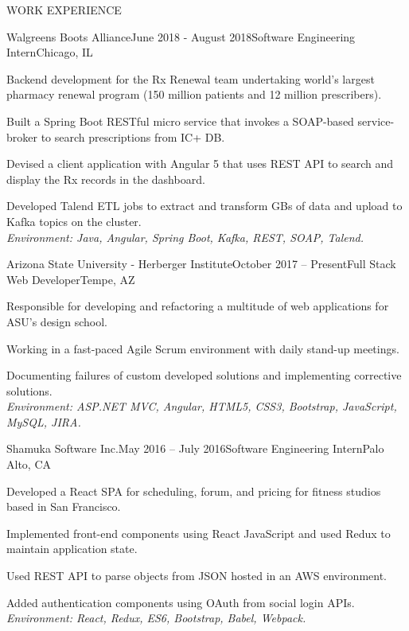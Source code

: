 \documentclass{resume} %
\begin{document}
\begin{rSection}{WORK EXPERIENCE}

\begin{rSubsection}{Walgreens Boots Alliance}{June 2018 - August 2018}{Software Engineering Intern}{Chicago, IL} 

\item Backend development for the Rx Renewal team undertaking world's largest pharmacy renewal program (150 million patients and 12 million prescribers).
\item Built a Spring Boot RESTful micro service that invokes a SOAP-based service-broker to search prescriptions from IC+ DB.
\item Devised a client application with Angular 5 that uses REST API to search and display the Rx records in the dashboard.
\item Developed Talend ETL jobs to extract and transform GBs of data and upload to Kafka topics on the cluster.
\\\textit{Environment: Java, Angular, Spring Boot, Kafka, REST, SOAP, Talend.}

\end{rSubsection} 

\begin{rSubsection}{Arizona State University - Herberger Institute}{October 2017 – Present}{Full Stack Web Developer}{Tempe, AZ}
\item Responsible for developing and refactoring a multitude of web applications for ASU’s design school.
\item Working in a fast-paced Agile Scrum environment with daily stand-up meetings. 
\item Documenting failures of custom developed solutions and implementing corrective solutions. 
\\\textit{Environment: ASP.NET MVC, Angular, HTML5, CSS3, Bootstrap, JavaScript, MySQL, JIRA.}
\end{rSubsection} 

\begin{rSubsection}{Shamuka Software Inc.}{May 2016 – July 2016}{Software Engineering Intern}{Palo Alto, CA} 

\item Developed a React SPA for scheduling, forum, and pricing for fitness studios based in San Francisco.
\item Implemented front-end components using React JavaScript and used Redux to maintain application state.
\item Used REST API to parse objects from JSON hosted in an AWS environment.
\item  Added authentication components using OAuth from social login APIs.
\\\textit{Environment: React, Redux, ES6, Bootstrap, Babel, Webpack.}
\end{rSubsection} 

\end{rSection}
\end{document}
